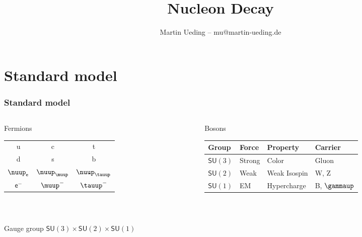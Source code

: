 \documentclass[english, fleqn]{beamer}
\title{Nucleon Decay}
\author{Martin Ueding -- mu@martin-ueding.de}
\begin{document}
\begin{frame}
    \titlepage
\end{frame}

\begin{frame}
    \titlepage
\end{frame}

\section{Standard model}

\begin{frame}
    \frametitle{Standard model}

    \begin{columns}[t]
        \begin{column}{.3\linewidth}
            \begin{block}{Fermions}
                \

                \begin{tabular}{ccc}
                    u & c & t \\
                    d & s & b \\
                    \midrule
                    $\nuup_\mathsf e$ & $\nuup_\muup$ & $\nuup_\tauup$ \\
                    $\mathsf e^-$ & $ \muup^-$ & $\tauup^-$
                \end{tabular}
            \end{block}
        \end{column}
        \begin{column}{.7\linewidth}
            \begin{block}{Bosons}
                \

                \begin{tabular}{llll}
                    Group & Force & Property & Carrier \\
                    \midrule
                    $\mathsf{SU}(3)$ & Strong & Color & Gluon \\
                    $\mathsf{SU}(2)$ & Weak & Weak Isospin & W, Z \\
                    $\mathsf{SU}(1)$ & EM & Hypercharge & B, $\gammaup$
                \end{tabular}
            \end{block}
        \end{column}
    \end{columns}

    \

    \begin{block}{Gauge group}
        $\mathsf{SU}(3) \times \mathsf{SU}(2) \times \mathsf{SU}(1)$
    \end{block}

\end{frame}
\end{document}
